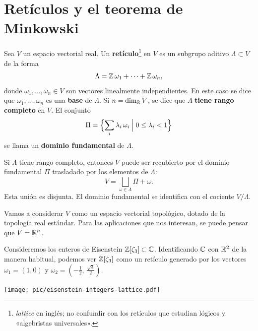 
\section{Retículos y el teorema de Minkowski}

\begin{definicion}
  Sea $V$ un espacio vectorial real.
  Un \textbf{retículo}\footnote{\emph{lattice} en inglés; no confundir con los
    retículos que estudian lógicos y «algebristas universales».}
  en $V$ es un subgrupo aditivo $\Lambda \subset V$ de la forma
  $$\Lambda = \mathbb{Z}\,\omega_1 + \cdots + \mathbb{Z}\,\omega_n,$$
  donde $\omega_1,\ldots,\omega_n \in V$ son vectores linealmente
  independientes. En este caso se dice que $\omega_1,\ldots,\omega_n$ es una
  \textbf{base} de $\Lambda$. Si $n = \dim_{\mathbb{R}} V$, se dice que $\Lambda$
  \textbf{tiene rango completo} en $V$. El conjunto
  $$\Pi = \Bigl\{ \sum_i \lambda_i\,\omega_i \Bigm| 0 \le \lambda_i < 1 \Bigr\}$$
  se llama un \textbf{dominio fundamental} de $\Lambda$.
\end{definicion}

\begin{comentario}
  Si $\Lambda$ tiene rango completo, entonces $V$ puede ser recubierto por el
  dominio fundamental $\Pi$ trasladado por los elementos de $\Lambda$:
  $$V = \bigsqcup_{\omega \in \Lambda} \Pi + \omega.$$
  Esta unión es disjunta. El dominio fundamental se identifica con el cociente
  $V/\Lambda$.
\end{comentario}

\begin{comentario}
  Vamos a considerar $V$ como un espacio vectorial topológico, dotado de la
  topología real estándar. Para las aplicaciones que nos interesan, se puede
  pensar que $V = \mathbb{R}^n$.
\end{comentario}

\begin{ejemplo}
  Consideremos los enteros de Eisenstein
  $\mathbb{Z} [\zeta_3] \subset \mathbb{C}$. Identificando $\mathbb{C}$ con $\mathbb{R}^2$ de la manera
  habitual, podemos ver $\mathbb{Z} [\zeta_3]$ como un retículo generado por los
  vectores $\omega_1 = (1,0)$ y
  $\omega_2 = \left(-\frac{1}{2}, \, \frac{\sqrt{3}}{2}\right)$.

  \begin{center}
    \texttt{[image: pic/eisenstein-integers-lattice.pdf]}
  \end{center}
\end{ejemplo}

